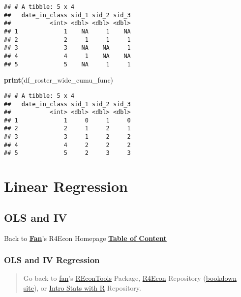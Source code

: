 \documentclass[
]{book}
\newenvironment{Shaded}{\begin{snugshade}}{\end{snugshade}}
\newcommand{\KeywordTok}[1]{\textcolor[rgb]{0.13,0.29,0.53}{\textbf{#1}}}
\newcommand{\NormalTok}[1]{#1}
\begin{document}
\begin{verbatim}
## # A tibble: 5 x 4
##   date_in_class sid_1 sid_2 sid_3
##           <int> <dbl> <dbl> <dbl>
## 1             1    NA     1    NA
## 2             2     1     1     1
## 3             3    NA    NA     1
## 4             4     1    NA    NA
## 5             5    NA     1     1
\end{verbatim}

\begin{Shaded}
\begin{Highlighting}[]
\KeywordTok{print}\NormalTok{(df_roster_wide_cumu_func)}
\end{Highlighting}
\end{Shaded}

\begin{verbatim}
## # A tibble: 5 x 4
##   date_in_class sid_1 sid_2 sid_3
##           <int> <dbl> <dbl> <dbl>
## 1             1     0     1     0
## 2             2     1     2     1
## 3             3     1     2     2
## 4             4     2     2     2
## 5             5     2     3     3
\end{verbatim}

\hypertarget{linear-regression}{%
\chapter{Linear Regression}\label{linear-regression}}

\hypertarget{ols-and-iv}{%
\section{OLS and IV}\label{ols-and-iv}}

Back to \textbf{\href{https://fanwangecon.github.io/}{Fan}}'s R4Econ Homepage \textbf{\href{https://fanwangecon.github.io/R4Econ/}{Table of Content}}

\hypertarget{ols-and-iv-regression}{%
\subsection{OLS and IV Regression}\label{ols-and-iv-regression}}

\begin{quote}
Go back to \href{http://fanwangecon.github.io/CodeDynaAsset/}{fan}'s \href{https://fanwangecon.github.io/REconTools/}{REconTools} Package, \href{https://fanwangecon.github.io/R4Econ/}{R4Econ} Repository (\href{https://fanwangecon.github.io/R4Econ/bookdown}{bookdown site}), or \href{https://fanwangecon.github.io/Stat4Econ/}{Intro Stats with R} Repository.
\end{quote}
\end{document}
